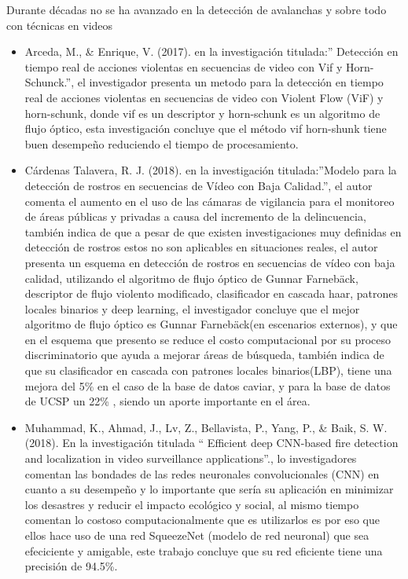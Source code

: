 \documentclass[a4paper,11pt]{report}
\begin{document}
Durante décadas no se ha avanzado en la detección de avalanchas y sobre todo con técnicas en videos
\cite{Christiansen2001}


\begin{itemize}
	

	
	\item Arceda, M., \& Enrique, V. (2017). en la investigación titulada:” Detección en tiempo real de acciones violentas en secuencias de video con Vif y Horn-Schunck.”, el investigador presenta un metodo  para la detección en tiempo real de acciones violentas en secuencias de video con Violent Flow (ViF) y horn-schunk, donde vif es un descriptor y horn-schunk  es un algoritmo de flujo óptico, esta investigación concluye que el método vif horn-shunk tiene buen desempeño reduciendo el tiempo de procesamiento.

 	\item
Cárdenas Talavera, R. J. (2018). en la investigación titulada:”Modelo para la detección de rostros en secuencias de Vídeo con Baja Calidad.”, el autor comenta el aumento en el  uso de las cámaras de vigilancia para el monitoreo de áreas públicas y privadas a causa del incremento de la delincuencia, también indica de que a pesar de que existen investigaciones muy definidas en detección de rostros estos no son aplicables en situaciones reales, el autor presenta un esquema en detección de rostros en secuencias de vídeo con baja calidad, utilizando el algoritmo de flujo óptico de Gunnar Farnebäck, descriptor de flujo violento modificado, clasificador en cascada haar, patrones locales binarios y deep learning, el investigador concluye que el mejor algoritmo de flujo óptico es Gunnar Farnebäck(en escenarios externos), y que en el esquema que presento se reduce el costo computacional por su proceso discriminatorio que ayuda a mejorar áreas de búsqueda, también indica de que su clasificador en cascada con patrones locales binarios(LBP), tiene una mejora del 5\% en el caso de la base de datos caviar, y para la base de datos de UCSP un 22\% , siendo un aporte importante en el área. 


	\item Muhammad, K., Ahmad, J., Lv, Z., Bellavista, P., Yang, P., \& Baik, S. W. (2018). En la investigación titulada “ Efficient deep CNN-based fire detection and localization in video surveillance applications”., lo investigadores comentan las bondades de las redes neuronales convolucionales (CNN) en cuanto a su desempeño  y lo importante que sería su aplicación en minimizar los desastres y reducir el impacto ecológico y social, al mismo tiempo comentan lo costoso computacionalmente que es utilizarlos es por eso que ellos hace uso de una red SqueezeNet (modelo de red neuronal) que sea efeciciente y amigable, este trabajo concluye que su red eficiente tiene una precisión de 94.5\%.
	

\end{itemize}
\end{document}
